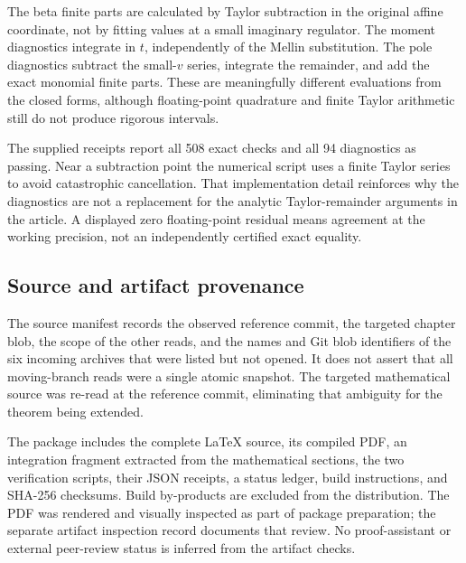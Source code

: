 \documentclass[11pt,letterpaper]{article}
\numberwithin{equation}{section}
\theoremstyle{definition}
\theoremstyle{remark}
\begin{document}
The beta finite parts are calculated by Taylor subtraction in the
original affine coordinate, not by fitting values at a small imaginary
regulator. The moment diagnostics integrate in $t$, independently of
the Mellin substitution. The pole diagnostics subtract the small-$v$
series, integrate the remainder, and add the exact monomial finite
parts. These are meaningfully different evaluations from the closed
forms, although floating-point quadrature and finite Taylor arithmetic
still do not produce rigorous intervals.

The supplied receipts report all 508 exact checks and all 94 diagnostics
as passing. Near a subtraction point the numerical script uses a finite
Taylor series to avoid catastrophic cancellation. That implementation
detail reinforces why the diagnostics are not a replacement for the
analytic Taylor-remainder arguments in the article. A displayed zero
floating-point residual means agreement at the working precision, not
an independently certified exact equality.

\subsection{Source and artifact provenance}

The source manifest records the observed reference commit, the targeted
chapter blob, the scope of the other reads, and the names and Git blob
identifiers of the six incoming archives that were listed but not
opened. It does not assert that all moving-branch reads were a single
atomic snapshot. The targeted mathematical source was re-read at the
reference commit, eliminating that ambiguity for the theorem being
extended.

The package includes the complete \LaTeX{} source, its compiled PDF, an
integration fragment extracted from the mathematical sections, the two
verification scripts, their JSON receipts, a status ledger, build
instructions, and SHA-256 checksums. Build by-products are excluded from
the distribution. The PDF was rendered and visually inspected as part of
package preparation; the separate artifact inspection record documents
that review. No proof-assistant or external peer-review status is inferred
from the artifact checks.
\end{document}
